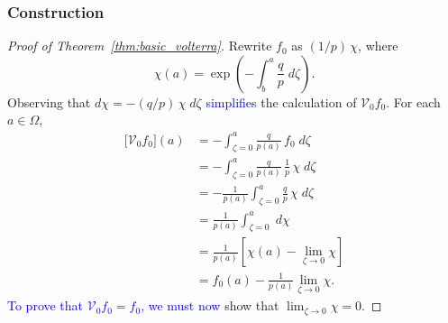 \documentclass[review]{siamart220329}
\newcommand{\hardpart}{\mathcal{V}_0}
\newcommand{\solproto}{f_0}
\newcommand{\domain}{\Omega}
\begin{document}
\subsubsection{Construction}\label{sec:construction}
\begin{proof}[Proof of Theorem~\ref{thm:basic_volterra}]
Rewrite $\solproto$ as $(1/p)\,\chi$, where
\[ \chi(a) = \exp\left(-\int_{b}^{a}\frac{q}{p}\;d\zeta\right). \]
Observing that $d\chi = -(q/p)\,\chi\;d\zeta$ \textcolor{blue}{simplifies} the calculation of $\hardpart \solproto$. For each $a \in \domain$,
\begin{align*}
\big[\hardpart \solproto\big](a) &= - \int_{\zeta=0}^{a} \frac{q}{p(a)}\,\solproto\;d\zeta \\
& = -\int_{\zeta=0}^{a} \frac{q}{p(a)}\,\frac{1}{p}\,\chi\;d\zeta \\
& = - \frac{1}{p(a)}  \int_{\zeta=0}^{a} \frac{q}{p}\,\chi\;d\zeta\\
& = \frac{1}{p(a)} \int_{\zeta=0}^{a}\;d\chi \\
& = \frac{1}{p(a)} \left[ \chi(a) - \lim_{\zeta \to 0} \chi \right] \\
& = \solproto(a) - \frac{1}{p(a)} \lim_{\zeta \to 0} \chi.
\end{align*}
\textcolor{blue}{To prove that $\hardpart \solproto = \solproto$, we must now} show that $\lim_{\zeta \to 0} \chi = 0$.


\end{proof}
\end{document}
